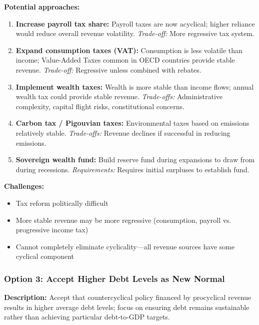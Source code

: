 \documentclass[12pt,letterpaper]{article}
\begin{document}
\textbf{Potential approaches:}
\begin{enumerate}
    \item \textbf{Increase payroll tax share:} Payroll taxes are now acyclical; higher reliance would reduce overall revenue volatility. \textit{Trade-off:} More regressive tax system.

    \item \textbf{Expand consumption taxes (VAT):} Consumption is less volatile than income; Value-Added Taxes common in OECD countries provide stable revenue. \textit{Trade-off:} Regressive unless combined with rebates.

    \item \textbf{Implement wealth taxes:} Wealth is more stable than income flows; annual wealth tax could provide stable revenue. \textit{Trade-offs:} Administrative complexity, capital flight risks, constitutional concerns.

    \item \textbf{Carbon tax / Pigouvian taxes:} Environmental taxes based on emissions relatively stable. \textit{Trade-offs:} Revenue declines if successful in reducing emissions.

    \item \textbf{Sovereign wealth fund:} Build reserve fund during expansions to draw from during recessions. \textit{Requirements:} Requires initial surpluses to establish fund.
\end{enumerate}

\textbf{Challenges:}
\begin{itemize}
    \item Tax reform politically difficult
    \item More stable revenue may be more regressive (consumption, payroll vs. progressive income tax)
    \item Cannot completely eliminate cyclicality—all revenue sources have some cyclical component
\end{itemize}

\subsubsection{Option 3: Accept Higher Debt Levels as New Normal}

\textbf{Description:} Accept that countercyclical policy financed by procyclical revenue results in higher average debt levels; focus on ensuring debt remains sustainable rather than achieving particular debt-to-GDP targets.
\end{document}
